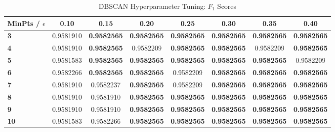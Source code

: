 \begin{table}[h]
\centering
\caption{DBSCAN Hyperparameter Tuning: $F_1$ Scores}
\label{tab:dbscan_tuning}
\begin{tabular}{@{}lccccccc@{}}
\toprule
MinPts / $\epsilon$ & \textbf{0.10} & \textbf{0.15} & \textbf{0.20} & \textbf{0.25} & \textbf{0.30} & \textbf{0.35} & \textbf{0.40} \\
\midrule
\textbf{3} & 0.9581910 & \textbf{0.9582565} & \textbf{0.9582565} & \textbf{0.9582565} & \textbf{0.9582565} & \textbf{0.9582565} & \textbf{0.9582565} \\
\textbf{4} & 0.9581910 & \textbf{0.9582565} & 0.9582209 & \textbf{0.9582565} & \textbf{0.9582565} & 0.9582209 & \textbf{0.9582565} \\
\textbf{5} & 0.9581583 & \textbf{0.9582565} & \textbf{0.9582565} & \textbf{0.9582565} & \textbf{0.9582565} & \textbf{0.9582565} & 0.9582209 \\
\textbf{6} & 0.9582266 & \textbf{0.9582565} & \textbf{0.9582565} & 0.9582209 & \textbf{0.9582565} & \textbf{0.9582565} & \textbf{0.9582565} \\
\textbf{7} & 0.9581910 & 0.9582237 & \textbf{0.9582565} & 0.9582209 & \textbf{0.9582565} & \textbf{0.9582565} & \textbf{0.9582565} \\
\textbf{8} & 0.9581910 & 0.9581910 & \textbf{0.9582565} & \textbf{0.9582565} & \textbf{0.9582565} & \textbf{0.9582565} & \textbf{0.9582565} \\
\textbf{9} & 0.9581910 & 0.9581910 & \textbf{0.9582565} & \textbf{0.9582565} & \textbf{0.9582565} & \textbf{0.9582565} & \textbf{0.9582565} \\
\textbf{10} & 0.9581583 & 0.9582266 & \textbf{0.9582565} & \textbf{0.9582565} & \textbf{0.9582565} & \textbf{0.9582565} & \textbf{0.9582565} \\
\bottomrule
\end{tabular}
\end{table}

